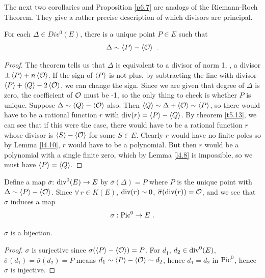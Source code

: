 The next two corollaries and Proposition \ref{p6.7} are analogs of the Riemann-Roch Theorem. They give a rather precise description of which divisors are principal.

\begin{coro}
\label{c5.14}
For each $\Delta\in Div^{0}(E)$, there is a unique point $P\in E$ such that
$$
\Delta\sim\divisor{P}-\divisor{\cuz}\ .
$$
\end{coro}

\begin{proof}
The theorem tells us that $\Delta$ is equivalent to a divisor of norm 1, \ie, a divisor $\pm \left\langle P \right \rangle + n \left\langle \mathcal{O} \right \rangle$. If the sign of $\left\langle P \right \rangle$ is not plus, by subtracting the line with divisor  $\left\langle P \right \rangle + \left\langle Q \right \rangle - 2\left\langle \mathcal{O} \right \rangle$, we can change the sign. Since we are given that degree of $\Delta$ is zero, the coefficient of $\mathcal{O}$ must be -1, so the only thing to check is whether $P$ is unique. Suppose $\Delta \sim \left\langle Q \right \rangle - \left\langle \mathcal{O} \right \rangle$ also. Then $\left\langle Q \right \rangle \sim \Delta + \left\langle \mathcal{O} \right \rangle \sim \left\langle P \right \rangle$, so there would have to be a rational function $r$ with $\operatorname{div}(r)= \left\langle P \right \rangle - \left\langle Q \right \rangle$. By theorem \ref{t5.13}, we can see that if this were the case, there would have to be a rational function $r$ whose divisor is 
$\left\langle S \right \rangle-\left\langle \mathcal{O} \right \rangle$ for some $S\in E$. Clearly $r$ would have no finite poles so by Lemma \ref{l4.10}, $r$ would have to be a polynomial. But then $r$ would be a polynomial with a single finite zero, which by Lemma \ref{l4.8} is impossible, so we must have $\left\langle P \right \rangle=\left\langle Q \right \rangle$.
\end{proof}

Define a map $\overline{\sigma}$: $\operatorname{div}^{0}(E)\rightarrow E$ by $\overline{\sigma}(\Delta)=P$ where $P$ is the unique point with $\Delta\sim\left\langle P \right \rangle-\left\langle \mathcal{O} \right \rangle$. Since $\forall\, r \in K(E)$, $\operatorname{div}(r)\sim 0$, $\overline{\sigma}(\operatorname{div}(r))=\mathcal{O}$, and we see that $\overline{\sigma}$ induces a map
$$
\sigma:\operatorname{Pic}^{0}\rightarrow E\ .
$$
\begin{coro}
\label{c5.15}
$\sigma$ is a bijection.
\end{coro}

\begin{proof}
$\sigma$ is surjective since $\sigma(\left\langle P \right \rangle-\left\langle \mathcal{O} \right \rangle)=P$. For $d_1$, $d_2 \in \operatorname{div}^0(E)$, $\overline{\sigma}(d_1)=\overline{\sigma}(d_2)=P$ means $d_1\sim \left\langle P \right \rangle-\left\langle \mathcal{O} \right \rangle\sim d_2$, hence $d_1 = d_2$ in $\operatorname{Pic}^{0}$, hence $\sigma$ is injective.
\end{proof}

